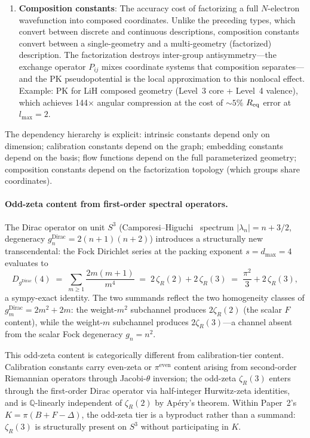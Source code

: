 \documentclass[aps,pra,twocolumn,superscriptaddress,longbibliography]{revtex4-2}
\begin{document}
\begin{enumerate}
  \item \textbf{Composition constants}: The accuracy cost of
    factorizing a full $N$-electron wavefunction into composed
    coordinates.  Unlike the preceding types, which convert between
    discrete and continuous descriptions, composition constants
    convert between a single-geometry and a multi-geometry
    (factorized) description.  The factorization destroys inter-group
    antisymmetry---the exchange operator $P_{ij}$ mixes coordinate
    systems that composition separates---and the PK pseudopotential
    is the local approximation to this nonlocal effect.  Example:
    PK for LiH composed geometry (Level~3 core + Level~4 valence),
    which achieves 144$\times$ angular compression at the cost of
    ${\sim}5\%$ $R_{\rm eq}$ error at $l_{\max} = 2$.
\end{enumerate}

The dependency hierarchy is explicit: intrinsic constants depend
only on dimension; calibration constants depend on the graph;
embedding constants depend on the basis; flow functions depend
on the full parameterized geometry; composition constants depend
on the factorization topology (which groups share coordinates).

\paragraph{Odd-zeta content from first-order spectral operators.}
The Dirac operator on unit $S^3$ (Camporesi--Higuchi~\cite{camporesi_higuchi1996}
spectrum $|\lambda_n| = n + 3/2$, degeneracy
$g_n^{\text{Dirac}} = 2(n+1)(n+2)$) introduces a structurally new
transcendental: the Fock Dirichlet series at the packing exponent
$s = d_{\max} = 4$ evaluates to
\begin{equation}\label{eq:dirac_dirichlet_zeta3}
  D_{g^{\text{Dirac}}}(4)
  \;=\; \sum_{m \geq 1} \frac{2m(m+1)}{m^4}
  \;=\; 2\,\zeta_R(2) + 2\,\zeta_R(3)
  \;=\; \frac{\pi^2}{3} + 2\,\zeta_R(3),
\end{equation}
a sympy-exact identity.  The two summands reflect the two homogeneity
classes of $g_m^{\text{Dirac}} = 2m^2 + 2m$: the weight-$m^2$ subchannel
produces $2\zeta_R(2)$ (the scalar $F$ content), while the weight-$m$
subchannel produces $2\zeta_R(3)$---a channel absent from the scalar
Fock degeneracy $g_n = n^2$.

This odd-zeta content is categorically different from calibration-tier
content.  Calibration constants carry even-zeta or $\pi^{\text{even}}$
content arising from second-order Riemannian operators through
Jacobi-$\theta$ inversion; the odd-zeta $\zeta_R(3)$ enters through
the first-order Dirac operator via half-integer Hurwitz-zeta identities,
and is $\mathbb{Q}$-linearly independent of $\zeta_R(2)$ by Ap\'ery's
theorem.  Within Paper~2's $K = \pi(B + F - \Delta)$, the odd-zeta tier
is a byproduct rather than a summand: $\zeta_R(3)$ is structurally
present on $S^3$ without participating in $K$.
\end{document}
